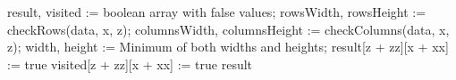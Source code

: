 \begin{algorithm}[H]
\begin{algorithmic}
    \State result, visited := boolean array with false values;
            \State rowsWidth, rowsHeight := checkRows(data, x, z);
            \State columnsWidth, columnsHeight := checkColumns(data, x, z);
            \State width, height := Minimum of both widths and heights;
                        \State result[z + zz][x + xx] := true
                    \EndIf
                    \State visited[z + zz][x + xx] := true
                \EndFor             
            \EndIf
        \EndIf     
    \EndFor
    \State\Return result
\EndProcedure
\end{algorithmic}
\end{algorithm}








